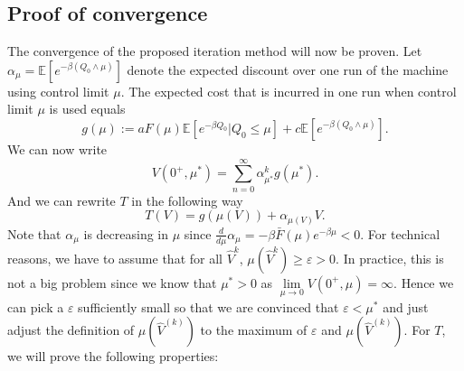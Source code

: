 \documentclass[a4paper]{thesis}
\theoremstyle{definition}
\begin{document}
\subsection{Proof of convergence}
The convergence of the proposed iteration method will now be proven.
Let $\alpha_\mu=\mathbb{E}[e^{-\beta (Q_0\wedge\mu)}]$ denote the expected discount over one run of the machine using control limit $\mu$.
The expected cost that is incurred in one  run when control limit $\mu$ is used equals
$$
g(\mu):=aF(\mu)\mathbb{E}[e^{-\beta Q_0}|Q_0\leq \mu]+c\mathbb{E}[e^{-\beta(Q_0\wedge\mu)}].
$$
We can now write
$$
V(0^+,\mu^*)=\sum\limits_{n=0}^\infty \alpha_{\mu^*}^kg(\mu^*).
$$
And we can rewrite $T$ in the following way
\[
T(V)=g(\mu(V))+\alpha_{\mu(V)}V.
\]
Note that $\alpha_\mu$ is decreasing in $\mu$ since $\frac{d}{d\mu}\alpha_\mu=-\beta\bar F(\mu)e^{-\beta \mu}<0$.
For technical reasons, we have to assume that for all $\hat{V}^{k}$, $\mu(\hat{V}^{k})\geq\varepsilon>0$.
In practice, this is not a big problem since we know that $\mu^*>0$ as $\lim\limits_{\mu\rightarrow 0}V(0^+,\mu)=\infty$.
Hence we can pick a $\varepsilon$ sufficiently small so that we are convinced that $\varepsilon<\mu^*$ and just adjust the definition of $\mu(\hat{V}^{(k)})$ to the maximum of $\varepsilon$ and $\mu(\hat{V}^{(k)})$.
For $T$, we will prove the following properties:
\end{document}
